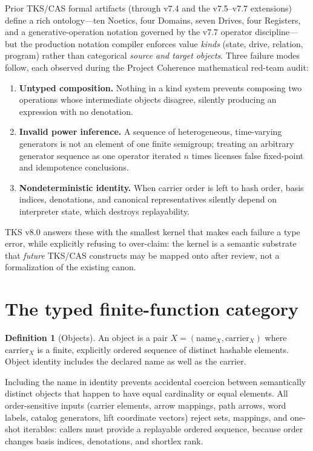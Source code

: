 \documentclass[11pt]{amsart}
\theoremstyle{definition}
\newtheorem{definition}[theorem]{Definition}
\theoremstyle{remark}
\begin{document}
Prior TKS/CAS formal artifacts (through v7.4 and the v7.5--v7.7 extensions) define a rich ontology---ten Noetics, four Domains, seven Drives, four Registers, and a generative-operation notation governed by the v7.7 operator discipline---but the production notation compiler enforces value \emph{kinds} (state, drive, relation, program) rather than categorical \emph{source and target objects}. Three failure modes follow, each observed during the Project Coherence mathematical red-team audit:

\begin{enumerate}
\item \textbf{Untyped composition.} Nothing in a kind system prevents composing two operations whose intermediate objects disagree, silently producing an expression with no denotation.
\item \textbf{Invalid power inference.} A sequence of heterogeneous, time-varying generators is not an element of one finite semigroup; treating an arbitrary generator sequence as one operator iterated $n$ times licenses false fixed-point and idempotence conclusions.
\item \textbf{Nondeterministic identity.} When carrier order is left to hash order, basis indices, denotations, and canonical representatives silently depend on interpreter state, which destroys replayability.
\end{enumerate}

TKS v8.0 answers these with the smallest kernel that makes each failure a type error, while explicitly refusing to over-claim: the kernel is a semantic substrate that \emph{future} TKS/CAS constructs may be mapped onto after review, not a formalization of the existing canon.

\section{The typed finite-function category}

\begin{definition}[Objects]\label{def:object}
An object is a pair $X=(\mathrm{name}_X,\mathrm{carrier}_X)$ where $\mathrm{carrier}_X$ is a finite, explicitly ordered sequence of distinct hashable elements. Object identity includes the declared name as well as the carrier.
\end{definition}

Including the name in identity prevents accidental coercion between semantically distinct objects that happen to have equal cardinality or equal elements. All order-sensitive inputs (carrier elements, arrow mappings, path arrows, word labels, catalog generators, lift coordinate vectors) reject sets, mappings, and one-shot iterables: callers must provide a replayable ordered sequence, because order changes basis indices, denotations, and shortlex rank.
\end{document}
